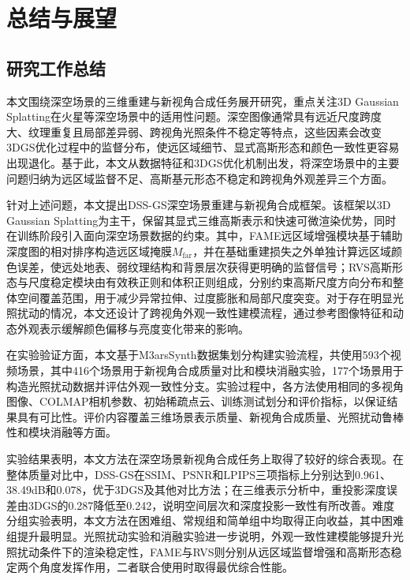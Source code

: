 
\chapter{总结与展望}

\section{研究工作总结}

本文围绕深空场景的三维重建与新视角合成任务展开研究，重点关注3D Gaussian Splatting在火星等深空场景中的适用性问题。深空图像通常具有远近尺度跨度大、纹理重复且局部差异弱、跨视角光照条件不稳定等特点，这些因素会改变3DGS优化过程中的监督分布，使远区域细节、显式高斯形态和颜色一致性更容易出现退化。基于此，本文从数据特征和3DGS优化机制出发，将深空场景中的主要问题归纳为远区域监督不足、高斯基元形态不稳定和跨视角外观差异三个方面。

针对上述问题，本文提出DSS-GS深空场景重建与新视角合成框架。该框架以3D Gaussian Splatting为主干，保留其显式三维高斯表示和快速可微渲染优势，同时在训练阶段引入面向深空场景数据的约束。其中，FAME远区域增强模块基于辅助深度图的相对排序构造远区域掩膜$M_{\mathrm{far}}$，并在基础重建损失之外单独计算远区域颜色误差，使远处地表、弱纹理结构和背景层次获得更明确的监督信号；RVS高斯形态与尺度稳定模块由有效秩正则和体积正则组成，分别约束高斯尺度方向分布和整体空间覆盖范围，用于减少异常拉伸、过度膨胀和局部尺度突变。对于存在明显光照扰动的情况，本文还设计了跨视角外观一致性建模流程，通过参考图像特征和动态外观表示缓解颜色偏移与亮度变化带来的影响。

在实验验证方面，本文基于M3arsSynth数据集划分构建实验流程，共使用593个视频场景，其中416个场景用于新视角合成质量对比和模块消融实验，177个场景用于构造光照扰动数据并评估外观一致性分支。实验过程中，各方法使用相同的多视角图像、COLMAP相机参数、初始稀疏点云、训练测试划分和评价指标，以保证结果具有可比性。评价内容覆盖三维场景表示质量、新视角合成质量、光照扰动鲁棒性和模块消融等方面。

实验结果表明，本文方法在深空场景新视角合成任务上取得了较好的综合表现。在整体质量对比中，DSS-GS在$\mathrm{SSIM}$、$\mathrm{PSNR}$和$\mathrm{LPIPS}$三项指标上分别达到0.961、38.49dB和0.078，优于3DGS及其他对比方法；在三维表示分析中，重投影深度误差由3DGS的0.287降低至0.242，说明空间层次和深度投影一致性有所改善。难度分组实验表明，本文方法在困难组、常规组和简单组中均取得正向收益，其中困难组提升最明显。光照扰动实验和消融实验进一步说明，外观一致性建模能够提升光照扰动条件下的渲染稳定性，FAME与RVS则分别从远区域监督增强和高斯形态稳定两个角度发挥作用，二者联合使用时取得最优综合性能。

